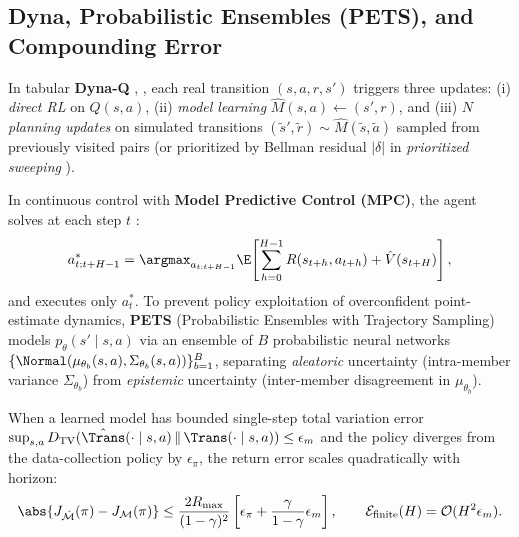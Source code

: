 \documentclass[../../../../master.tex]{subfiles}
\begin{document}
\subsection{Dyna, Probabilistic Ensembles (PETS), and Compounding Error}
\label{sec:mbrl:dyna_pets}

\begin{coremath}
In tabular \textbf{Dyna-Q} , , each real transition $(s, a, r, s')$ triggers three updates: (i) \emph{direct RL} on $Q(s, a)$, (ii) \emph{model learning} $\hat{M}(s, a) \leftarrow (s', r)$, and (iii) $N$ \emph{planning updates} on simulated transitions $(\tilde{s}', \tilde{r}) \sim \hat{M}(\tilde{s}, \tilde{a})$ sampled from previously visited pairs (or prioritized by Bellman residual $|\delta|$ in \emph{prioritized sweeping} ).

In continuous control with \textbf{Model Predictive Control (MPC)}, the agent solves at each step $t$ :
\begin{equation}
\label{eq:mbrl:mpc}
a^*_{t:t+H-1} = \argmax_{a_{t:t+H-1}} \E\!\left[\sum_{h=0}^{H-1} R(s_{t+h}, a_{t+h}) + \hat{V}(s_{t+H})\right],
\end{equation}
and executes only $a^*_t$. To prevent policy exploitation of overconfident point-estimate dynamics, \textbf{PETS} (Probabilistic Ensembles with Trajectory Sampling)  models $p_\theta(s' \mid s, a)$ via an ensemble of $B$ probabilistic neural networks $\{\Normal(\mu_{\theta_b}(s, a), \Sigma_{\theta_b}(s, a))\}_{b=1}^B$, separating \emph{aleatoric} uncertainty (intra-member variance $\Sigma_{\theta_b}$) from \emph{epistemic} uncertainty (inter-member disagreement in $\mu_{\theta_b}$).

When a learned model has bounded single-step total variation error $\sup_{s,a} D_{\mathrm{TV}}(\hat{\Trans}(\cdot \mid s,a) \,\|\, \Trans(\cdot \mid s,a)) \le \epsilon_m$ and the policy diverges from the data-collection policy by $\epsilon_\pi$, the return error scales quadratically with horizon:
\begin{equation}
\label{eq:mbrl:compounding}
\abs{J_{\hat{\mathcal{M}}}(\pi) - J_{\mathcal{M}}(\pi)} \le \frac{2 R_{\max}}{(1-\gamma)^2}\left[\epsilon_\pi + \frac{\gamma}{1-\gamma}\epsilon_m\right], \qquad
\mathcal{E}_{\text{finite}}(H) = \mathcal{O}(H^2 \epsilon_m).
\end{equation}
\end{coremath}
\end{document}

